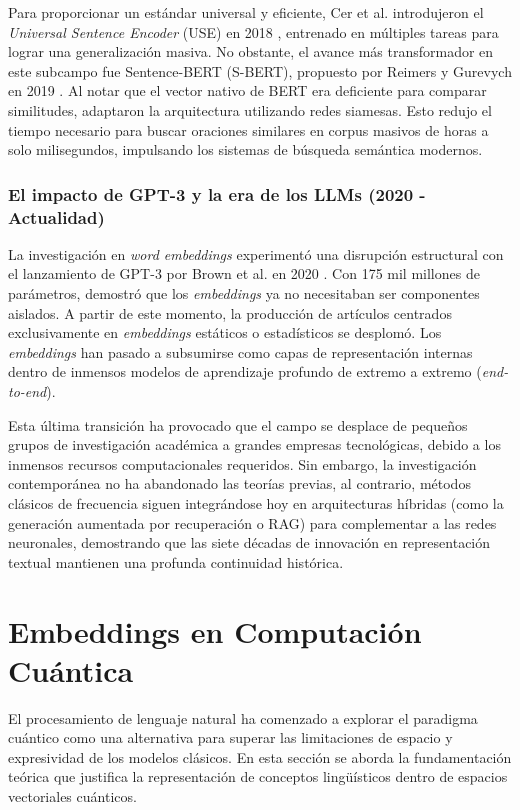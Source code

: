 Para proporcionar un estándar universal y eficiente, Cer et al. introdujeron el \textit{Universal Sentence Encoder} (USE) en 2018 \cite{cer_universal_2018}, entrenado en múltiples tareas para lograr una generalización masiva. No obstante, el avance más transformador en este subcampo fue Sentence-BERT (S-BERT), propuesto por Reimers y Gurevych en 2019 \cite{reimers_sentence_2019}. Al notar que el vector nativo de BERT era deficiente para comparar similitudes, adaptaron la arquitectura utilizando redes siamesas. Esto redujo el tiempo necesario para buscar oraciones similares en corpus masivos de horas a solo milisegundos, impulsando los sistemas de búsqueda semántica modernos.

\subsubsection{El impacto de GPT-3 y la era de los LLMs (2020 - Actualidad)}

La investigación en \textit{word embeddings} experimentó una disrupción estructural con el lanzamiento de GPT-3 por Brown et al. en 2020 \cite{brown_language_2020}. Con 175 mil millones de parámetros, demostró que los \textit{embeddings} ya no necesitaban ser componentes aislados. A partir de este momento, la producción de artículos centrados exclusivamente en \textit{embeddings} estáticos o estadísticos se desplomó. Los \textit{embeddings} han pasado a subsumirse como capas de representación internas dentro de inmensos modelos de aprendizaje profundo de extremo a extremo (\textit{end-to-end}).

Esta última transición ha provocado que el campo se desplace de pequeños grupos de investigación académica a grandes empresas tecnológicas, debido a los inmensos recursos computacionales requeridos. Sin embargo, la investigación contemporánea no ha abandonado las teorías previas, al contrario, métodos clásicos de frecuencia siguen integrándose hoy en arquitecturas híbridas (como la generación aumentada por recuperación o RAG) para complementar a las redes neuronales, demostrando que las siete décadas de innovación en representación textual mantienen una profunda continuidad histórica.


\section{Embeddings en Computación Cuántica}
\label{sec:embeddings_cuanticos}

El procesamiento de lenguaje natural ha comenzado a explorar el paradigma cuántico como una alternativa para superar las limitaciones de espacio y expresividad de los modelos clásicos. En esta sección se aborda la fundamentación teórica que justifica la representación de conceptos lingüísticos dentro de espacios vectoriales cuánticos.

